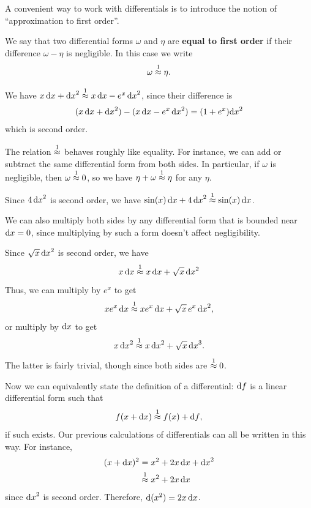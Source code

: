 A convenient way to work with differentials is to introduce the notion of ``approximation to first order''.

\begin{defn}
  We say that two differential forms $\omega$ and $\eta$ are \textbf{equal to first order} if their difference $\omega-\eta$ is negligible.
  In this case we write
  \[\omega\mathrel{\overset{1}{\approx}} \eta.\]
\end{defn}

\begin{eg}
  We have $x\,{\mathrm{d} x} + {\mathrm{d} x}^2 \mathrel{\overset{1}{\approx}} x\,{\mathrm{d} x} - e^x \,{\mathrm{d} x}^2$, since their difference is
  \[ (x\,{\mathrm{d} x} + {\mathrm{d} x}^2) - (x\,{\mathrm{d} x} - e^x\, {\mathrm{d} x}^2) = (1+e^x){\mathrm{d} x}^2 \]
  which is second order.
\end{eg}

The relation $\mathrel{\overset{1}{\approx}}$ behaves roughly like equality.
For instance, we can add or subtract the same differential form from both sides.
In particular, if $\omega$ is negligible, then $\omega\mathrel{\overset{1}{\approx}}0$, so we have $\eta + \omega \mathrel{\overset{1}{\approx}} \eta$ for any $\eta$.

\begin{eg}
  Since $4\,{\mathrm{d} x}^2$ is second order, we have $\sin(x) \,{\mathrm{d} x} + 4\, {\mathrm{d} x}^2 \mathrel{\overset{1}{\approx}} \sin(x)\,{\mathrm{d} x}$.
\end{eg}

We can also multiply both sides by any differential form that is bounded near ${\mathrm{d} x}=0$, since multiplying by such a form doesn't affect negligibility.

\begin{eg}
  Since $\sqrt{x}\, {\mathrm{d} x}^2$ is second order, we have
  \[x\,{\mathrm{d} x} \mathrel{\overset{1}{\approx}} x\,{\mathrm{d} x} + \sqrt{x}\, {\mathrm{d} x}^2\]
  Thus, we can multiply by $e^x$ to get
  \[x e^x \,{\mathrm{d} x} \mathrel{\overset{1}{\approx}} x e^x\,{\mathrm{d} x} + \sqrt{x}\, e^x\, {\mathrm{d} x}^2,\]
  or multiply by ${\mathrm{d} x}$ to get
  \[x\,{\mathrm{d} x}^2 \mathrel{\overset{1}{\approx}} x\,{\mathrm{d} x}^2 + \sqrt{x} \,{\mathrm{d} x}^3. \]
  The latter is fairly trivial, though since both sides are $\mathrel{\overset{1}{\approx}} 0$.
\end{eg}

Now we can equivalently state the definition of a differential: ${\mathrm{d} f}$ is a linear differential form such that
\[ f(x+{\mathrm{d} x}) \mathrel{\overset{1}{\approx}} f(x) + {\mathrm{d} f}, \]
if such exists.
Our previous calculations of differentials can all be written in this way.
For instance,
\begin{align*}
  (x+{\mathrm{d} x})^2 &= x^2 + 2 x\,{\mathrm{d} x} + {\mathrm{d} x}^2\\
  &\mathrel{\overset{1}{\approx}} x^2 + 2 x\,{\mathrm{d} x}
\end{align*}
since ${\mathrm{d} x}^2$ is second order.
Therefore, $\mathrm{d}(x^2) = 2x\,{\mathrm{d} x}$.


